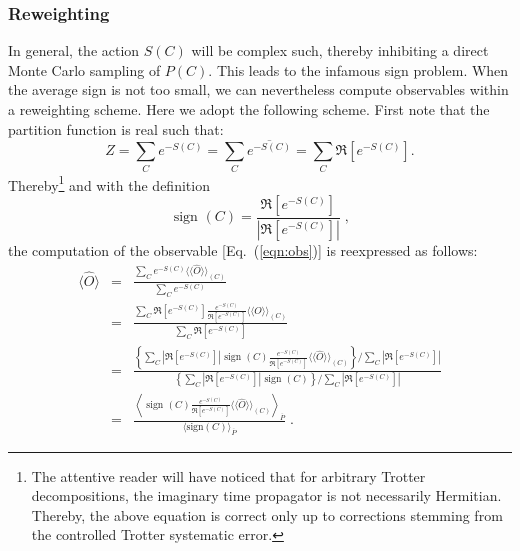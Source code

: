\subsubsection{Reweighting}

In general, the action  $S(C) $ will be complex such, thereby inhibiting a direct Monte Carlo sampling of $P(C)$.   This leads to the infamous sign problem.  When the average sign is not too small, we can nevertheless  compute observables within a reweighting scheme.   Here we adopt the following scheme. First  note  that the partition function is real such that: 
\begin{equation}
	Z =   \sum_{C}  e^{-S(C)}    =  \sum_{C}  \overline{e^{-S(C)}} = \sum_{C}  \Re \left[e^{-S(C)} \right]. 
\end{equation}
Thereby\footnote{The attentive reader will have noticed that   for arbitrary Trotter decompositions,  the  imaginary time propagator is not necessarily Hermitian. Thereby, the above equation is correct only up to corrections stemming from the  controlled Trotter systematic error. }
and with the definition
\begin{equation}
\label{Sign.eq}
	 \text{ sign }(C)   =  \frac{   \Re \left[e^{-S(C)} \right]  } {\left| \Re \left[e^{-S(C)} \right]  \right|  }\;,
\end{equation}
the computation of the observable [Eq.~(\ref{eqn:obs})] is reexpressed as follows:
\begin{eqnarray}\label{eqn:obs_rw}
\langle \hat{O}  \rangle  &=&  \frac{\sum_{C}  e^{-S(C)} \langle \langle \hat{O}  \rangle \rangle_{(C)} }{\sum_{C}  e^{-S(C)}}       \nonumber \\ 
                          &=&  \frac{\sum_{C}   \Re \left[e^{-S(C)} \right]    \frac{e^{-S(C)}} {\Re \left[e^{-S(C)} \right]}  \langle \langle \hat{O}  \rangle \rangle_{(C)} }{\sum_{C}   \Re \left[e^{-S(C)} \right]}    \nonumber \\ 
          &=&
   \frac{
     \left\{
      \sum_{C}  \left| \Re \left[e^{-S(C)} \right]  \right|   \text{ sign }(C)   \frac{e^{-S(C)}} {\Re \left[e^{-S(C)} \right]}  \langle \langle \hat{O}  \rangle \rangle_{(C)}  \right\}/
            \sum_{C}  \left| \Re \left[ e^{-S(C)} \right] \right|  
          }  
          { 
          \left\{ \sum_{C}  \left|  \Re \left[ e^{-S(C)} \right]   \right|   \text{ sign }(C) \right\}/
            \sum_{C}   \left| \Re \left[ e^{-S(C)} \right] \right|  
          } \nonumber\\
          &=&
  	 \frac{  \left\langle  \text{ sign }(C)   \frac{e^{-S(C)}} {\Re \left[e^{-S(C)} \right]}  \langle \langle \hat{O}  \rangle \rangle_{(C)}  \right\rangle_{\overline{P}} } { \langle \text{sign} (C)   \rangle_{\overline{P}}}  \;.      
\end{eqnarray} 
